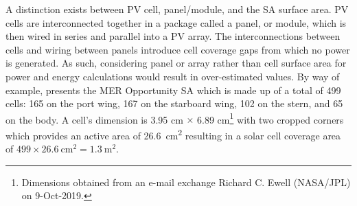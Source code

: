 A distinction exists between \ac{PV} cell, panel/module, and the \ac{SA} surface area. \ac{PV} cells are interconnected together in a package called a panel, or module, which is then wired in series and parallel into a \ac{PV} array. The interconnections between cells and wiring between panels introduce cell coverage gaps from which no power is generated. As such, considering panel or array rather than cell surface area for power and energy calculations would result in over-estimated values. By way of example,  presents the \ac{MER} Opportunity \ac{SA} which is made up of a total of 499 cells: 165 on the port wing, 167 on the starboard wing, 102 on the stern, and 65 on the body. A cell's dimension is 3.95 \si{\centi\meter} $\times$  6.89 \si{\centi\meter}\footnote{Dimensions obtained from an e-mail exchange Richard C. Ewell (NASA/JPL) on 9-Oct-2019.} with two cropped corners which provides an active area of \SI{26.6}{\centi\meter\squared} resulting in a solar cell coverage area of $499 \times \SI{26.6}{\centi\meter\squared} = \SI{1.3}{\meter\squared}$.

